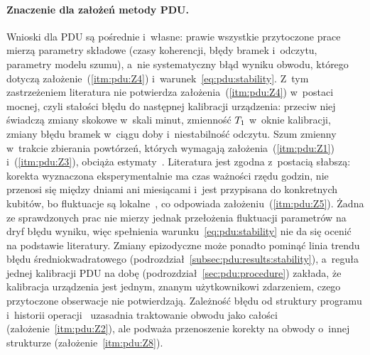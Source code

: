 \paragraph{Znaczenie dla założeń metody PDU.}
Wnioski dla PDU są pośrednie i~własne: prawie wszystkie przytoczone prace mierzą parametry składowe (czasy koherencji, błędy bramek i~odczytu, parametry modelu szumu), a~nie systematyczny błąd wyniku obwodu, którego dotyczą założenie~(\ref{itm:pdu:Z4}) i~warunek~\eqref{eq:pdu:stability}.
Z~tym zastrzeżeniem literatura nie potwierdza założenia~(\ref{itm:pdu:Z4}) w~postaci mocnej, czyli stałości błędu do następnej kalibracji urządzenia: przeciw niej świadczą zmiany skokowe w~skali minut, zmienność $T_1$ w~oknie kalibracji, zmiany błędu bramek w~ciągu doby i~niestabilność odczytu.
Szum zmienny w~trakcie zbierania powtórzeń, których wymagają założenia~(\ref{itm:pdu:Z1}) i~(\ref{itm:pdu:Z3}), obciąża estymaty~\cite{kim_error_2025,proctor_detecting_2020}.
Literatura jest zgodna z~postacią słabszą: korekta wyznaczona eksperymentalnie ma czas ważności rzędu godzin, nie przenosi się między dniami ani miesiącami i~jest przypisana do konkretnych kubitów, bo fluktuacje są lokalne~\cite{burnett_decoherence_2019,etxezarreta_multiqubit_2023}, co odpowiada założeniu~(\ref{itm:pdu:Z5}).
Żadna ze sprawdzonych prac nie mierzy jednak przełożenia fluktuacji parametrów na dryf błędu wyniku, więc spełnienia warunku~\eqref{eq:pdu:stability} nie da się ocenić na podstawie literatury.
Zmiany epizodyczne może ponadto pominąć linia trendu błędu średniokwadratowego (podrozdział~\ref{subsec:pdu:results:stability}), a~reguła jednej kalibracji PDU na dobę (podrozdział~\ref{sec:pdu:procedure}) zakłada, że kalibracja urządzenia jest jednym, znanym użytkownikowi zdarzeniem, czego przytoczone obserwacje nie potwierdzają.
Zależność błędu od struktury programu i~historii operacji~\cite{proctor_measuring_2022,white_demonstration_2020} uzasadnia traktowanie obwodu jako całości (założenie~\ref{itm:pdu:Z2}), ale podważa przenoszenie korekty na obwody o~innej strukturze (założenie~\ref{itm:pdu:Z8}).

